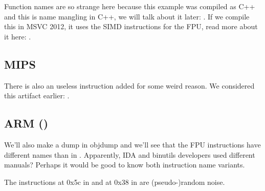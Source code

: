 

Function names are so strange here because this example was compiled as C++ and this is name mangling in C++,
we will talk about it later: .
If we compile this in MSVC 2012, it uses the SIMD instructions for the FPU, read more about it here: .

\subsection{MIPS}



There is also an useless  instruction added for some weird reason.
We considered this artifact earlier: .

\subsection{ARM (\ARMMode)}




We'll also make a dump in objdump and we'll see that the FPU instructions have different names than in \IDA.
Apparently, IDA and binutils developers used different manuals?
Perhaps it would be good to know both instruction name variants.



The instructions at 0x5c in  and at 0x38 in \main are (pseudo-)random noise.

